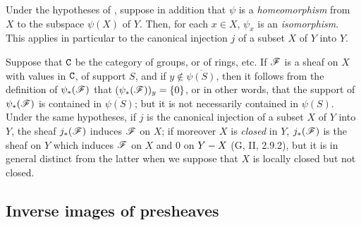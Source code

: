 \begin{env}[3.4.5]
\label{0.3.4.5}
Under the hypotheses of , suppose in addition that $\psi$ is a \emph{homeomorphism} from $X$ to the subspace $\psi(X)$ of $Y$.
Then, for each $x\in X$, $\psi_x$ is an \emph{isomorphism}.
This applies in particular to the canonical injection $j$ of a subset $X$ of $Y$ into $Y$.
\end{env}

\begin{env}[3.4.6]
\label{0.3.4.6}
Suppose that $\mathtt{C}$ be the category of groups, or of rings, etc. If $\mathscr{F}$ is a
sheaf on $X$ with values in $\mathtt{C}$, of support $S$, and if
$y\not\in\overline{\psi(S)}$, then it follows from the definition of
$\psi_*(\mathscr{F})$ that $(\psi_*(\mathscr{F}))_y=\{0\}$, or in other words, that the
support of $\psi_*(\mathscr{F})$ is contained in $\overline{\psi(S)}$; but it is not
necessarily contained in $\psi(S)$. Under the same hypotheses, if $j$ is the
canonical injection of a subset $X$ of $Y$ into $Y$, the sheaf $j_*(\mathscr{F})$
induces $\mathscr{F}$ on $X$; if moreover $X$ is \emph{closed} in $Y$, $j_*(\mathscr{F})$
is the sheaf on $Y$ which induces $\mathscr{F}$ on $X$ and $0$ on $Y- X$
(G, II, 2.9.2), but it is in general distinct from the latter when we suppose
that $X$ is locally closed but not closed.
\end{env}

\subsection{Inverse images of presheaves}
\label{subsection:0.3.5}

